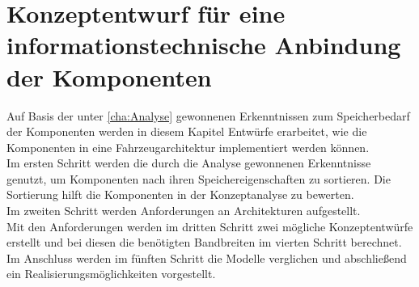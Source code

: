 \chapter{Konzeptentwurf für eine informationstechnische Anbindung der Komponenten} \label{cha:Konzeptentwurf}
Auf Basis der unter \ref{cha:Analyse} gewonnenen Erkenntnissen zum Speicherbedarf der Komponenten werden in diesem Kapitel Entwürfe erarbeitet, wie die Komponenten in eine Fahrzeugarchitektur implementiert werden können.\\
Im ersten Schritt werden die durch die Analyse gewonnenen Erkenntnisse genutzt, um Komponenten nach ihren Speichereigenschaften zu sortieren. Die Sortierung hilft die Komponenten in der Konzeptanalyse zu bewerten. \\
Im zweiten Schritt werden Anforderungen an Architekturen aufgestellt. \\
Mit den Anforderungen werden im dritten Schritt zwei mögliche Konzeptentwürfe erstellt und bei diesen die benötigten Bandbreiten im vierten Schritt berechnet. \\
Im Anschluss werden im fünften Schritt die Modelle verglichen und abschließend ein Realisierungsmöglichkeiten vorgestellt.
